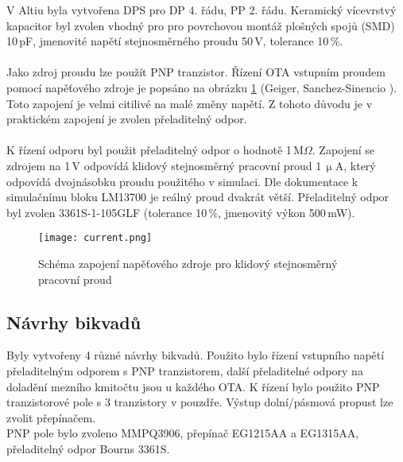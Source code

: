 \noindent V Altiu byla vytvořena DPS pro DP 4. řádu, PP 2. řádu. Keramický vícevrstvý kapacitor byl zvolen vhodný pro pro povrchovou montáž plošných spojů (SMD) 10\,pF, jmenovité napětí stejnosměrného proudu 50\,V, tolerance 10\,\%. \\
\\
Jako zdroj proudu lze použít PNP tranzistor. Řízení OTA vstupním proudem pomocí napěťového zdroje je popsáno na obrázku \ref{s:DC} (Geiger, Sanchez-Sinencio \cite{25}). Toto zapojení je velmi citilivé na malé změny napětí. Z tohoto důvodu je v praktickém zapojení je zvolen přeladitelný odpor. \\
\\
K řízení odporu byl použit přeladitelný odpor o hodnotě 1\,M$\Omega$. Zapojení se zdrojem na 1\,V odpovídá klidový stejnosměrný pracovní proud 1\,$\upmu$A, který odpovídá dvojnásobku proudu použitého v simulaci. Dle dokumentace k simulačnímu bloku LM13700 je reálný proud dvakrát větší. Přeladitelný odpor byl zvolen 3361S-1-105GLF (tolerance 10\,\%, jmenovitý výkon 500\,mW). 
\begin{figure}[h]
\centering
\texttt{[image: current.png]}
\caption{Schéma zapojení napěťového zdroje pro klidový stejnosměrný pracovní proud \label{s:DC}}
\end{figure}
\subsection{Návrhy bikvadů}
\noindent Byly vytvořeny 4 různé návrhy bikvadů. Použito bylo řízení vstupního napětí přeladitelným odporem s PNP tranzistorem, další přeladitelné odpory na doladění mezního kmitočtu jsou u každého OTA. K řízení bylo použito PNP tranzistorové pole s 3 tranzistory v pouzdře. Výstup dolní/pásmová propust lze zvolit přepínačem.\\
\noindent PNP pole bylo zvoleno MMPQ3906, přepínač EG1215AA a EG1315AA, přeladitelný odpor Bourns 3361S.